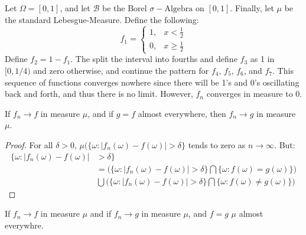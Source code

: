     \begin{example}
        Let $\Omega=[0,1]$, and let $\mathcal{B}$ be the Borel
        $\sigma-\textrm{Algebra}$ on $[0,1]$. Finally, let $\mu$ be the standard
        Lebesgue-Measure. Define the following:
        \begin{equation}
            f_{1}=
            \begin{cases}
                1,&x<\frac{1}{2}\\
                0,&x\geq\frac{1}{2}
            \end{cases}
        \end{equation}
        Define $f_{2}=1-f_{1}$. The split the interval into fourths and define
        $f_{3}$ as 1 in $[0,1/4)$ and zero otherwise, and continue the pattern
        for $f_{4}$, $f_{5}$, $f_{6}$, and $f_{7}$. This sequence of functions
        converges nowhere since there will be 1's and 0's oscillating back and
        forth, and thus there is no limit. However, $f_{n}$ converges in
        measure to 0.
    \end{example}
    \begin{theorem}
        If $f_{n}\rightarrow{f}$ in measure $\mu$, and if $g=f$ almost
        everywhere, then $f_{n}\rightarrow{g}$ in measure $\mu$.
    \end{theorem}
    \begin{proof}
        For all $\delta>0$,
        $\mu(\{\omega:|f_{n}(\omega)-f(\omega)|>\delta\}$
        tends to zero as $n\rightarrow\infty$. But:
        \begin{equation}
            \begin{split}
                \{\omega:|f_{n}(\omega)-f(\omega)|
                &>\delta\}\\
                &=\Big(
                    \{\omega:|f_{n}(\omega)-f(\omega)|>\delta\}
                    \bigcap
                    \{\omega:f(\omega)=g(\omega)\}
                \Big)\\
                &\bigcup\Big(
                    \{\omega:|f_{n}(\omega)-f(\omega)|>\delta\}
                    \bigcap
                    \{\omega:f(\omega)\ne{g}(\omega)\}
                \Big)
            \end{split}
        \end{equation}
    \end{proof}
    \begin{theorem}
        If $f_{n}\rightarrow{f}$ in measure $\mu$ and if $f_{n}\rightarrow{g}$
        in measure $\mu$, and $f=g$ $\mu$ almost everywhre.
    \end{theorem}
